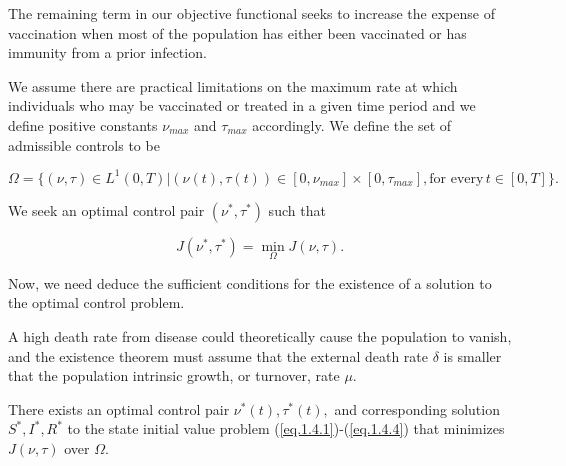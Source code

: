 The remaining term in our objective functional seeks to increase the expense of 
vaccination when most of the population has either been vaccinated or has 
immunity from a prior infection.

We assume there are practical limitations on the maximum rate at which 
individuals who may be vaccinated or treated in a given time period and we 
define positive constants $\nu_{max}$ and $\tau_{max}$ accordingly.
We define the set of admissible controls to be 

\begin{equation}\label{eq.1.4.6}
\Omega =\{(\nu,\tau)\in L^1(0,T) |  (\nu (t), \tau (t))\in [0,\nu_{max}]\times 
[0,\tau_{max}], \mbox{for every}\, t\in [0,T]\}.
\end{equation}

We seek an optimal control pair $(\nu^*,\tau^*)$ such that

\begin{equation}\label{eq.1.4.7}
J(\nu^*,\tau^*)=\min_{\Omega}J(\nu,\tau).
\end{equation}

Now, we need deduce the sufficient conditions for the existence of a solution 
to the optimal control problem.

A high death rate from disease could theoretically cause the population to 
vanish, and the existence theorem must assume that the external death rate 
$\delta$ is smaller that the population intrinsic growth, or turnover, rate 
$\mu$.

\begin{theorem}\label{Teo.Ex.Ap}
There exists an optimal control pair $\nu^*(t),\tau^*(t),$ and corresponding 
solution $S^*,I^*,R^*$ to the state initial value problem 
(\ref{eq.1.4.1})-(\ref{eq.1.4.4}) that minimizes $J(\nu,\tau)$ over $\Omega$.
\end{theorem}

